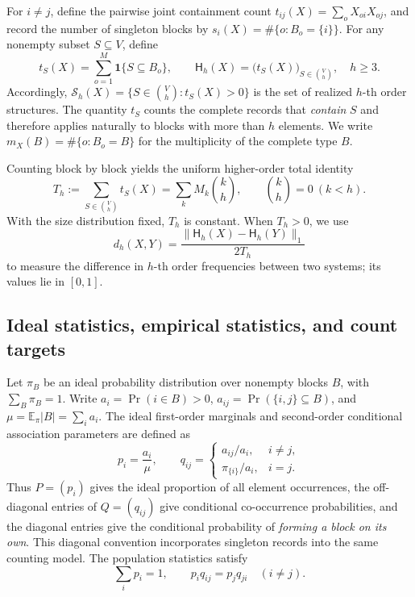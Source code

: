 \documentclass[11pt,a4paper]{article}
\numberwithin{equation}{section}
\theoremstyle{definition}
\numberwithin{algorithm}{section}
\begin{document}
For $i\neq j$, define the pairwise joint containment count
$t_{ij}(X)=\sum_oX_{oi}X_{oj}$, and record the number of singleton blocks by
$s_i(X)=\#\{o:B_o=\{i\}\}$.
For any nonempty subset $S\subseteq V$, define
\begin{equation}
t_S(X)=\sum_{o=1}^M\mathbf 1\{S\subseteq B_o\},\qquad
\mathsf H_h(X)=\bigl(t_S(X)\bigr)_{S\in\binom{V}{h}},\quad h\geq3.
\label{eq:high-order}
\end{equation}
Accordingly, $\mathcal S_h(X)=\{S\in\binom Vh:t_S(X)>0\}$ is the set of realized
$h$-th order structures.
The quantity $t_S$ counts the complete records that \emph{contain} $S$ and therefore
applies naturally to blocks with more than $h$ elements.
We write $m_X(B)=\#\{o:B_o=B\}$ for the multiplicity of the complete type $B$.

Counting block by block yields the uniform higher-order total identity
\begin{equation}
T_h:=\sum_{S\in\binom Vh}t_S(X)=\sum_kM_k\binom kh,
\qquad \binom kh=0\ (k<h).
\label{eq:high-order-total}
\end{equation}
With the size distribution fixed, $T_h$ is constant.
When $T_h>0$, we use
\begin{equation}
d_h(X,Y)=\frac{\|\mathsf H_h(X)-\mathsf H_h(Y)\|_1}{2T_h}
\label{eq:high-order-distance}
\end{equation}
to measure the difference in $h$-th order frequencies between two systems;
its values lie in $[0,1]$.

\subsection{Ideal statistics, empirical statistics, and count targets}\label{subsec:model-statistics}

Let $\pi_B$ be an ideal probability distribution over nonempty blocks $B$, with
$\sum_B\pi_B=1$.
Write \mbox{$a_i=\Pr(i\in B)>0$},
$a_{ij}=\Pr(\{i,j\}\subseteq B)$, and
$\mu=\mathbb E_\pi |B|=\sum_i a_i$.
The ideal first-order marginals and second-order conditional association parameters
are defined as
\begin{equation}
p_i=\frac{a_i}{\mu},\qquad
q_{ij}=
\begin{cases}
a_{ij}/a_i,&i\ne j,\\
\pi_{\{i\}}/a_i,&i=j.
\end{cases}
\label{eq:ideal-statistics}
\end{equation}
Thus $P=(p_i)$ gives the ideal proportion of all element occurrences,
the off-diagonal entries of $Q=(q_{ij})$ give conditional co-occurrence probabilities,
and the diagonal entries give the conditional probability of \emph{forming a block on its own}.
This diagonal convention incorporates singleton records into the same counting model.
The population statistics satisfy
\begin{equation}
\sum_i p_i=1,\qquad p_iq_{ij}=p_jq_{ji}\quad(i\ne j).
\label{eq:ideal-balance}
\end{equation}
\end{document}

